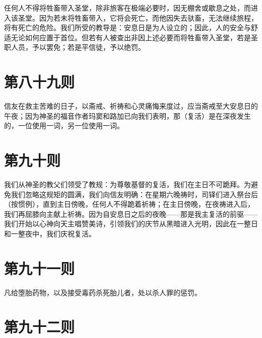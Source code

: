 任何人不得将牲畜带入圣堂，除非旅客在极端必要时，因无棚舍或歇息之处，而进入该圣堂。因为若未将牲畜带入，它将会死亡，而他因失去驮畜，无法继续旅程，将有死亡的危险。我们所受的教导是：安息日是为人设立的；因此，人的安全与舒适无论如何应置于首位。但若有人被查出非因上述必要而将牲畜带入圣堂，若是圣职人员，予以罢免；若是平信徒，予以绝罚。\par


\section{第八十九则}

信友在救主苦难的日子，以斋戒、祈祷和心灵痛悔来度过，应当斋戒至大安息日的午夜；因为神圣的福音作者玛窦和路加已向我们表明，那（复活）是在深夜发生的，一位使用一词，另一位使用一词。\par


\section{第九十则}

我们从神圣的教父们领受了教规：为尊敬基督的复活，我们在主日不可跪拜。为避免我们忽略这规矩的圆满，我们向信友明确：在星期六晚祷时，司铎们进入祭台后（按惯例），直到主日傍晚，任何人不得跪着祈祷；在主日傍晚，在夜祷进入后，我们再屈膝向主献上祈祷。因为自安息日之后的夜晚——那是我主复活的前驱——我们开始以心神向天主唱赞美诗，引领我们的庆节从黑暗进入光明，因此在一整日和一整夜中，我们庆祝复活。\par


\section{第九十一则}

凡给堕胎药物，以及接受毒药杀死胎儿者，处以杀人罪的惩罚。\par


\section{第九十二则}


